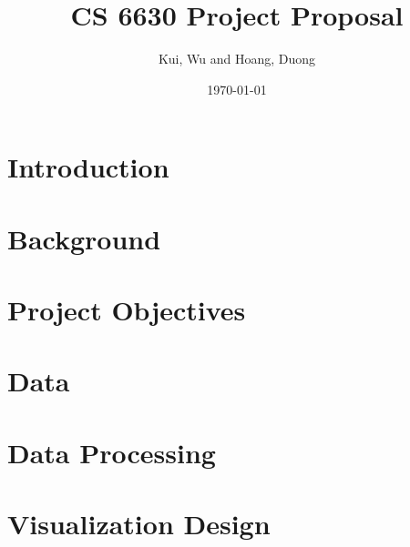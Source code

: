 \documentclass[dvips,12pt]{article}
\begin{document}

\title{CS 6630 Project Proposal}
\author{Kui, Wu and Hoang, Duong}
\date{\today}



\maketitle

\section{Introduction}

\section{Background}

\section{Project Objectives}

\section{Data}

\section{Data Processing}

\section{Visualization Design}
\end{document}
